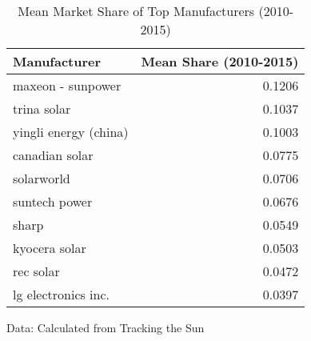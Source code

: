 \begin{table}[!t]
\caption*{
{\large Mean Market Share of Top Manufacturers (2010-2015)}
} 
\fontsize{12.0pt}{14.4pt}\selectfont
\begin{tabular*}{\linewidth}{@{\extracolsep{\fill}}lr}
\toprule
Manufacturer & Mean Share (2010-2015) \\ 
\midrule\addlinespace[2.5pt]
maxeon - sunpower & 0.1206 \\ 
trina solar & 0.1037 \\ 
yingli energy (china) & 0.1003 \\ 
canadian solar & 0.0775 \\ 
solarworld & 0.0706 \\ 
suntech power & 0.0676 \\ 
sharp & 0.0549 \\ 
kyocera solar & 0.0503 \\ 
rec solar & 0.0472 \\ 
lg electronics inc. & 0.0397 \\ 
\bottomrule
\end{tabular*}
\begin{minipage}{\linewidth}
Data: Calculated from Tracking the Sun\\
\end{minipage}
\end{table}
